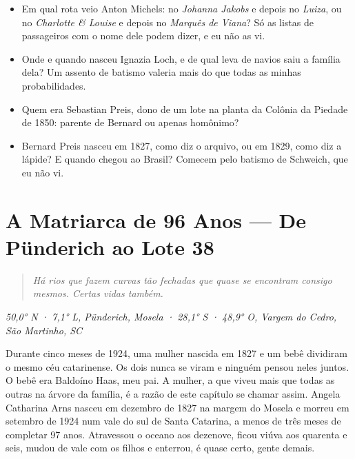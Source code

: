 \documentclass[
  brazilian,
  11pt,
  openany]{book}
\providecommand{\tightlist}{%
  \setlength{\itemsep}{0pt}\setlength{\parskip}{0pt}}
\begin{document}
\begin{itemize}
\tightlist
\item
  Em qual rota veio Anton Michels: no \emph{Johanna Jakobs} e depois no
  \emph{Luiza}, ou no \emph{Charlotte \& Louise} e depois no
  \emph{Marquês de Viana}? Só as listas de passageiros com o nome dele
  podem dizer, e eu não as vi.
\item
  Onde e quando nasceu Ignazia Loch, e de qual leva de navios saiu a
  família dela? Um assento de batismo valeria mais do que todas as
  minhas probabilidades.
\item
  Quem era Sebastian Preis, dono de um lote na planta da Colônia da
  Piedade de 1850: parente de Bernard ou apenas homônimo?
\item
  Bernard Preis nasceu em 1827, como diz o arquivo, ou em 1829, como diz
  a lápide? E quando chegou ao Brasil? Comecem pelo batismo de Schweich,
  que eu não vi.
\end{itemize}

\chapter{A Matriarca de 96 Anos --- De Pünderich ao Lote
38}\label{cap-9}

\begin{quote}
\emph{Há rios que fazem curvas tão fechadas que quase se encontram
consigo mesmos. Certas vidas também.}
\end{quote}

\emph{50,0° N · 7,1° L, Pünderich, Mosela · 28,1° S · 48,9° O, Vargem do
Cedro, São Martinho, SC}

Durante cinco meses de 1924, uma mulher nascida em 1827 e um bebê
dividiram o mesmo céu catarinense. Os dois nunca se viram e ninguém
pensou neles juntos. O bebê era Baldoíno Haas, meu pai. A mulher, a que
viveu mais que todas as outras na árvore da família, é a razão de este
capítulo se chamar assim. Angela Catharina Arns nasceu em dezembro de
1827 na margem do Mosela e morreu em setembro de 1924 num vale do sul de
Santa Catarina, a menos de três meses de completar 97 anos. Atravessou o
oceano aos dezenove, ficou viúva aos quarenta e seis, mudou de vale com
os filhos e enterrou, é quase certo, gente demais.
\end{document}
